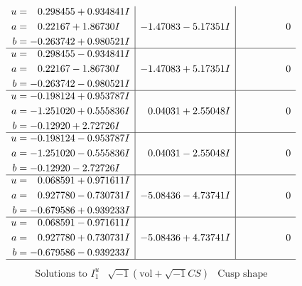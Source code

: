 \documentclass[1p]{elsarticle_modified}
\theoremstyle{definition}
\newcommand{\I}{\sqrt{-1}}
\begin{document}
$$\begin{array}{c|c|c}
\begin{aligned}
u &= \phantom{-}0.298455 + 0.934841 I \\
a &= \phantom{-}0.22167 + 1.86730 I \\
b &= -0.263742 + 0.980521 I\end{aligned}
 & -1.47083 - 5.17351 I & \phantom{-0.000000 } 0 \\ \hline\begin{aligned}
u &= \phantom{-}0.298455 - 0.934841 I \\
a &= \phantom{-}0.22167 - 1.86730 I \\
b &= -0.263742 - 0.980521 I\end{aligned}
 & -1.47083 + 5.17351 I & \phantom{-0.000000 } 0 \\ \hline\begin{aligned}
u &= -0.198124 + 0.953787 I \\
a &= -1.251020 + 0.555836 I \\
b &= -0.12920 + 2.72726 I\end{aligned}
 & \phantom{-}0.04031 + 2.55048 I & \phantom{-0.000000 } 0 \\ \hline\begin{aligned}
u &= -0.198124 - 0.953787 I \\
a &= -1.251020 - 0.555836 I \\
b &= -0.12920 - 2.72726 I\end{aligned}
 & \phantom{-}0.04031 - 2.55048 I & \phantom{-0.000000 } 0 \\ \hline\begin{aligned}
u &= \phantom{-}0.068591 + 0.971611 I \\
a &= \phantom{-}0.927780 - 0.730731 I \\
b &= -0.679586 + 0.939233 I\end{aligned}
 & -5.08436 - 4.73741 I & \phantom{-0.000000 } 0 \\ \hline\begin{aligned}
u &= \phantom{-}0.068591 - 0.971611 I \\
a &= \phantom{-}0.927780 + 0.730731 I \\
b &= -0.679586 - 0.939233 I\end{aligned}
 & -5.08436 + 4.73741 I & \phantom{-0.000000 } 0\\
 \hline 
 \end{array}$$\newpage$$\begin{array}{c|c|c}  
\text{Solutions to }I^u_{1}& \I (\text{vol} + \sqrt{-1}CS) & \text{Cusp shape}\\
 \hline 
\begin{aligned}

\end{aligned}
\end{array}$$
\end{document}
